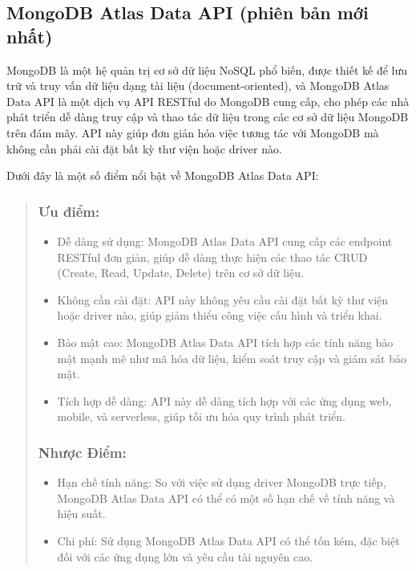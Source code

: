 \subsection{MongoDB Atlas Data API (phiên bản mới nhất)}
MongoDB là một hệ quản trị cơ sở dữ liệu NoSQL phổ biến, được thiết kế để lưu trữ và truy vấn dữ liệu dạng tài liệu (document-oriented), và MongoDB Atlas Data API là một dịch vụ API RESTful do MongoDB cung cấp, cho phép các nhà phát triển dễ dàng truy cập và thao tác dữ liệu trong các cơ sở dữ liệu MongoDB trên đám mây. API này giúp đơn giản hóa việc tương tác với MongoDB mà không cần phải cài đặt bất kỳ thư viện hoặc driver nào.

Dưới đây là một số điểm nổi bật về MongoDB Atlas Data API:

\begin{quote}
\subsubsection{Ưu điểm:}
\begin{itemize}
 \item Dễ dàng sử dụng: MongoDB Atlas Data API cung cấp các endpoint RESTful đơn giản, giúp dễ dàng thực hiện các thao tác CRUD (Create, Read, Update, Delete) trên cơ sở dữ liệu.
 \item Không cần cài đặt: API này không yêu cầu cài đặt bất kỳ thư viện hoặc driver nào, giúp giảm thiểu công việc cấu hình và triển khai.
 \item Bảo mật cao: MongoDB Atlas Data API tích hợp các tính năng bảo mật mạnh mẽ như mã hóa dữ liệu, kiểm soát truy cập và giám sát bảo mật.
 \item Tích hợp dễ dàng: API này dễ dàng tích hợp với các ứng dụng web, mobile, và serverless, giúp tối ưu hóa quy trình phát triển.
\end{itemize}

\subsubsection{Nhược Điểm:}
\begin{itemize}
 \item Hạn chế tính năng: So với việc sử dụng driver MongoDB trực tiếp, MongoDB Atlas Data API có thể có một số hạn chế về tính năng và hiệu suất.
 \item Chi phí: Sử dụng MongoDB Atlas Data API có thể tốn kém, đặc biệt đối với các ứng dụng lớn và yêu cầu tài nguyên cao.
\end{itemize}


\end{quote}
